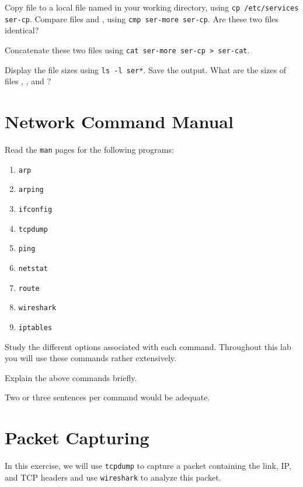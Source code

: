 \documentclass{../UTNetLab}
\begin{document}
    Copy  file to a local file named  in your working directory,
    using \lstinline{cp /etc/services ser-cp}. Compare files  and , using \lstinline{cmp ser-more ser-cp}. Are these two files identical?

    Concatenate these two files using \lstinline{cat ser-more ser-cp > ser-cat}.

    Display the file sizes using \lstinline{ls -l ser*}. Save the output. What are the sizes of files , , and ?

\section{Network Command Manual}
    Read the \lstinline{man} pages for the following programs:
    \begin{multicols}{3}
        \begin{enumerate}
            \item \lstinline{arp}
            \item \lstinline{arping}
            \item \lstinline{ifconfig}
            \item \lstinline{tcpdump}
            \item \lstinline{ping}
            \item \lstinline{netstat}
            \item \lstinline{route}
            \item \lstinline{wireshark}
            \item \lstinline{iptables}
        \end{enumerate}
    \end{multicols}
    Study the different options associated with each command.
    Throughout this lab you will use these commands rather extensively.
    
    \begin{report}
    \item Explain the above commands briefly.
    \item Two or three sentences per command would be adequate.
    \end{report}

\section{Packet Capturing}
    In this exercise, we will use \lstinline{tcpdump} to capture a packet containing the link, IP, and TCP headers and use \lstinline{wireshark} to analyze this packet.
\end{document}

